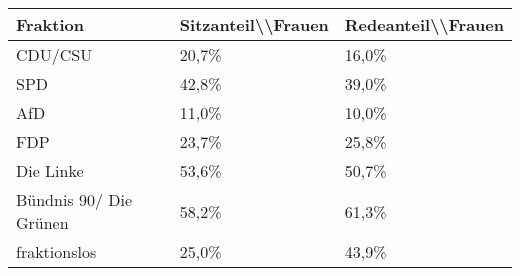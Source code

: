 
\begin{tabular}{lll}
\toprule
Fraktion & Sitzanteil\textbackslash{}\textbackslash{}Frauen & Redeanteil\textbackslash{}\textbackslash{}Frauen\\
\midrule
CDU/CSU & 20,7\% & 16,0\%\\
SPD & 42,8\% & 39,0\%\\
AfD & 11,0\% & 10,0\%\\
FDP & 23,7\% & 25,8\%\\
Die Linke & 53,6\% & 50,7\%\\
\addlinespace
Bündnis 90/ Die Grünen & 58,2\% & 61,3\%\\
fraktionslos & 25,0\% & 43,9\%\\
\bottomrule
\end{tabular}